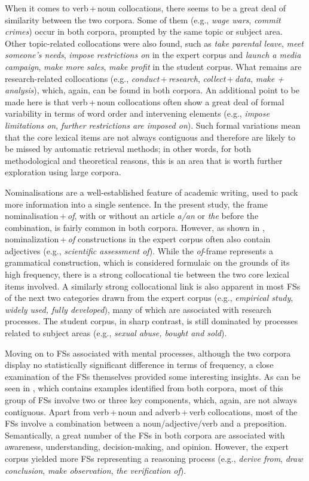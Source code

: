 \documentclass[output=paper]{langscibook}
\begin{document}
When it comes to verb\,+\,noun collocations, there seems to be a great deal of similarity between the two corpora. Some of them (e.g., \textit{wage wars}, \textit{commit crimes}) occur in both corpora, prompted by the same topic or subject area. Other topic-related collocations were also found, such as \textit{take parental leave}, \textit{meet someone’s needs}, \textit{impose restrictions on} in the expert corpus and \textit{launch a media campaign}, \textit{make more sales}, \textit{make profit} in the student corpus. What remains are research-related collocations (e.g., \textit{conduct}\,+\,\textit{research}, \textit{collect}\,+\,\textit{data}, \textit{make + analysis}), which, again, can be found in both corpora. An additional point to be made here is that verb\,+\,noun collocations often show a great deal of formal variability in terms of word order and intervening elements (e.g., \textit{impose limitations on}, \textit{further restrictions are imposed on}). Such formal variations mean that the core lexical items are not always contiguous and therefore are likely to be missed by automatic retrieval methods; in other words, for both methodological and theoretical reasons, this is an area that is worth further exploration using large corpora. 

Nominalisations are a well-established feature of academic writing, used to pack more information into a single sentence. In the present study, the frame nominalisation\,+\,\textit{of}, with or without an article \textit{a/an} or \textit{the} before the combination, is fairly common in both corpora. However, as shown in , nominalization\,+\,\textit{of} constructions in the expert corpus often also contain adjectives (e.g., \textit{scientific assessment of}). While the \textit{of}{}-frame represents a grammatical construction, which is considered formulaic on the grounds of its high frequency, there is a strong collocational tie between the two core lexical items involved. A similarly strong collocational link is also apparent in most FSs of the next two categories drawn from the expert corpus (e.g., \textit{empirical study}, \textit{widely used, fully developed}), many of which are associated with research processes. The student corpus, in sharp contrast, is still dominated by processes related to subject areas (e.g., \textit{sexual abuse, bought and sold}). 

Moving on to FSs associated with mental processes, although the two corpora display no statistically significant difference in terms of frequency, a close examination of the FSs themselves provided some interesting insights. As can be seen in , which contains examples identified from both corpora, most of this group of FSs involve two or three key components, which, again, are not always contiguous. Apart from verb\,+\,noun and adverb\,+\,verb collocations, most of the FSs involve a combination between a noun/adjective/verb and a preposition. Semantically, a great number of the FSs in both corpora are associated with awareness, understanding, decision-making, and opinion. However, the expert corpus yielded more FSs representing a reasoning process (e.g., \textit{derive from}, \textit{draw conclusion}, \textit{make observation}, \textit{the verification of}).
\end{document}
